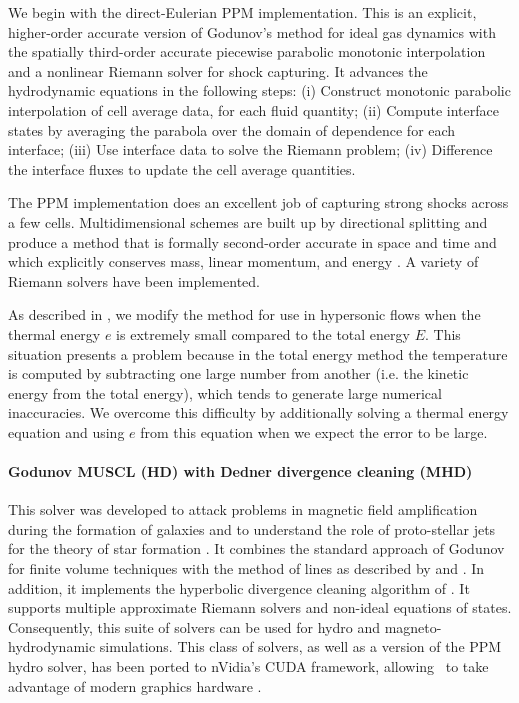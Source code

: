 We begin with the direct-Eulerian PPM implementation.  This is an
explicit, higher-order accurate version of Godunov's method for ideal
gas dynamics with the spatially third-order accurate piecewise parabolic monotonic
interpolation and a nonlinear Riemann solver for shock capturing.  It
advances the hydrodynamic equations in the following steps:
(i) Construct monotonic parabolic interpolation of cell average data,
for each fluid quantity;
(ii) Compute interface states by averaging the parabola over the
domain of dependence for each interface;
(iii) Use interface data to solve the Riemann problem;
(iv) Difference the interface fluxes to update the cell average
quantities.

The PPM implementation does an excellent job of capturing strong
shocks across a few cells.  Multidimensional schemes are built up by
directional splitting and produce a method that is formally
second-order accurate in space and time and which explicitly conserves mass,
linear momentum, and energy \citep{Hawley84, Norman86}.  A variety of
Riemann solvers have been implemented.

As described in \citet{1995CoPhC..89..149B}, we modify the method for use in
hypersonic flows when the thermal energy $e$ is extremely small
compared to the total energy $E$.  This situation presents a problem
because in the total energy method the temperature is computed by
subtracting one large number from another (i.e. the kinetic energy
from the total energy), which tends to generate large numerical
inaccuracies. We overcome this difficulty by additionally solving a
thermal energy equation and using $e$ from this equation when we
expect the error to be large.

\paragraph{Godunov MUSCL (HD) with Dedner divergence cleaning (MHD)}
This solver was developed to attack problems in magnetic field
amplification during the formation of galaxies \citep{Wang:2009a} and
to understand the role of proto-stellar jets for the theory of star
formation \citep{Wang:2009b}. It combines the standard approach of
Godunov \citep{Godunov1959} for finite volume techniques with the
method of lines as described by \cite{leveque2002finite} and
\cite{toro-1997}. In addition, it implements the hyperbolic divergence
cleaning algorithm of \cite{2002JCoPh.175..645D}. It supports multiple
approximate Riemann solvers and non-ideal equations of
states. Consequently, this suite of solvers can be used for hydro and
magneto-hydrodynamic simulations. This class of solvers, as
well as a version of the PPM hydro solver, has been ported to
nVidia's CUDA framework, allowing \enzo\ to take advantage of modern
graphics hardware \citep{Wang:2010}.

